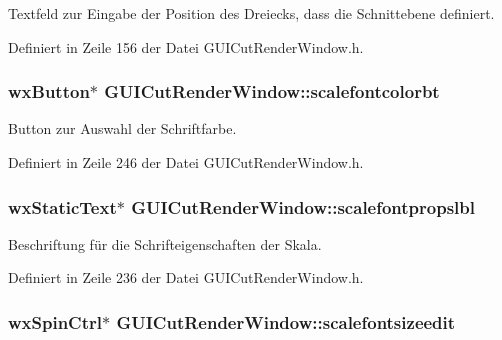 Textfeld zur Eingabe der Position des Dreiecks, dass die Schnittebene definiert. 



Definiert in Zeile 156 der Datei G\-U\-I\-Cut\-Render\-Window.\-h.

\hypertarget{classGUICutRenderWindow_a13a1557216de339d20189fdaa0df482b}{
\subsubsection[{scalefontcolorbt}]{\setlength{\rightskip}{0pt plus 5cm}wx\-Button$\ast$ G\-U\-I\-Cut\-Render\-Window\-::scalefontcolorbt\hspace{0.3cm}{\ttfamily [private]}}}\label{classGUICutRenderWindow_a13a1557216de339d20189fdaa0df482b}


Button zur Auswahl der Schriftfarbe. 



Definiert in Zeile 246 der Datei G\-U\-I\-Cut\-Render\-Window.\-h.

\hypertarget{classGUICutRenderWindow_a1f46a30a61ad94b76a6194758bdb3f95}{
\subsubsection[{scalefontpropslbl}]{\setlength{\rightskip}{0pt plus 5cm}wx\-Static\-Text$\ast$ G\-U\-I\-Cut\-Render\-Window\-::scalefontpropslbl\hspace{0.3cm}{\ttfamily [private]}}}\label{classGUICutRenderWindow_a1f46a30a61ad94b76a6194758bdb3f95}


Beschriftung für die Schrifteigenschaften der Skala. 



Definiert in Zeile 236 der Datei G\-U\-I\-Cut\-Render\-Window.\-h.

\hypertarget{classGUICutRenderWindow_a62cb232f5f9747c1fdbc5c1f6ff4b7a4}{
\subsubsection[{scalefontsizeedit}]{\setlength{\rightskip}{0pt plus 5cm}wx\-Spin\-Ctrl$\ast$ G\-U\-I\-Cut\-Render\-Window\-::scalefontsizeedit\hspace{0.3cm}{\ttfamily [private]}}}\label{classGUICutRenderWindow_a62cb232f5f9747c1fdbc5c1f6ff4b7a4}


